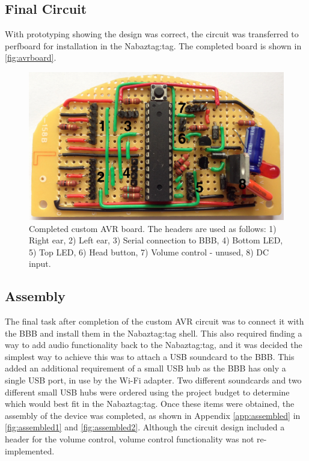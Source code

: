 \documentclass[12pt, a4paper]{article}
\begin{document}
	\subsection{Final Circuit}
	
	With prototyping showing the design was correct, the circuit was transferred to perfboard for installation in the Nabaztag:tag. The completed board is shown in \autoref{fig:avrboard}.
	
			\begin{figure}[H]
			\centerline{
				\includegraphics[scale=0.11]{images/avrboard.jpg}
			}
			\caption[Completed custom AVR board]{Completed custom AVR board. The headers are used as follows: 1) Right ear, 2) Left ear, 3) Serial connection to \ac{BBB}, 4) Bottom \ac{LED}, 5) Top \ac{LED}, 6) Head button, 7) Volume control - unused, 8) DC input.}
			\label{fig:avrboard}
		\end{figure}
		
	\subsection{Assembly}
	
	The final task after completion of the custom AVR circuit was to connect it with the \ac{BBB} and install them in the Nabaztag:tag shell. This also required finding a way to add audio functionality back to the Nabaztag:tag, and it was decided the simplest way to achieve this was to attach a \ac{USB} soundcard to the \ac{BBB}. This added an additional requirement of a small \ac{USB} hub as the \ac{BBB} has only a single \ac{USB} port, in use by the Wi-Fi adapter. Two different soundcards and two different small \ac{USB} hubs were ordered using the project budget to determine which would best fit in the Nabaztag:tag. Once these items were obtained, the assembly of the device was completed, as shown in Appendix \ref{app:assembled} in \autoref{fig:assembled1} and \autoref{fig:assembled2}. Although the circuit design included a header for the volume control, volume control functionality was not re-implemented.
		
\end{document}
